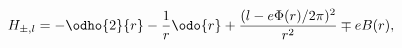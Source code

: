 \begin{equation}
\label{Eq_0204}
H_{\pm, l} = - \odho{2}{r} - \frac{1}{r} \odo{r}
	+ \frac{(l - e\Phi(r) / 2\pi)^2}{r^2} \mp e B(r),
\end{equation} 
